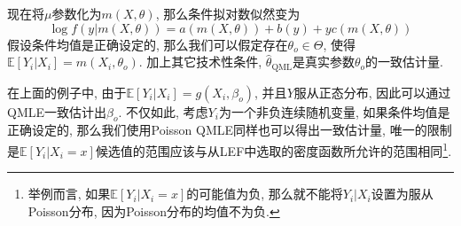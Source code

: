 \documentclass[cn, 12pt, math=mtpro2, bibstyle=apa, blue, twocol]{elegantbook}
\newcommand{\E}{\mathbb{E}}
\begin{document}
现在将$\mu$参数化为$m(X,\theta)$, 那么条件拟对数似然变为
$$\log f(y|m(X,\theta))=a(m(X,\theta))+b(y)+yc(m(X,\theta))$$
假设条件均值是正确设定的, 那么我们可以假定存在$\theta_o\in\Theta$, 使得$\E[Y_i|X_i]=m(X_i,\theta_o)$. 加上其它技术性条件, $\hat{\theta}_\text{QML}$是真实参数$\theta_o$的一致估计量.

在上面的例子中, 由于$\E[Y_i|X_i]=g(X_i,\beta_o)$, 并且$Y$服从正态分布, 因此可以通过QMLE一致估计出$\beta_o$. 不仅如此, 考虑$Y_i$为一个非负连续随机变量, 如果条件均值是正确设定的, 那么我们使用Poisson QMLE同样也可以得出一致估计量, 唯一的限制是$\E[Y_i|X_i=x]$候选值的范围应该与从LEF中选取的密度函数所允许的范围相同\footnote{举例而言, 如果$\E[Y_i|X_i=x]$的可能值为负, 那么就不能将$Y_i|X_i$设置为服从Poisson分布, 因为Poisson分布的均值不为负.}.


\end{document}
